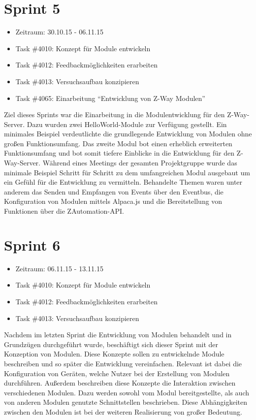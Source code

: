 \documentclass[12pt, oneside, smallheadings]{scrbook}
\begin{document}
\section{Sprint 5}
\begin{itemize}
	\item Zeitraum: 30.10.15 - 06.11.15
	\item Task \#4010: Konzept für Module entwickeln
	\item Task \#4012: Feedbackmöglichkeiten erarbeiten
	\item Task \#4013: Versuchsaufbau konzipieren
	\item Task \#4065: Einarbeitung "`Entwicklung von Z-Way Modulen"'
\end{itemize}
Ziel dieses Sprints war die Einarbeitung in die Modulentwicklung für den Z-Way-Server. Dazu wurden zwei HelloWorld-Module zur Verfügung gestellt. Ein minimales Beispiel verdeutlichte die grundlegende Entwicklung von Modulen ohne großen Funktionsumfang. Das zweite Modul bot einen erheblich erweiterten Funktionsumfang und bot somit tiefere Einblicke in die Entwicklung für den Z-Way-Server. Während eines Meetings der gesamten Projektgruppe wurde das minimale Beispiel Schritt für Schritt zu dem umfangreichen Modul ausgebaut um ein Gefühl für die Entwicklung zu vermitteln. Behandelte Themen waren unter anderem das Senden und Empfangen von Events über den Eventbus, die Konfiguration von Modulen mittels Alpaca.js und die Bereitstellung von Funktionen über die ZAutomation-API.

\section{Sprint 6}
\begin{itemize}
	\item Zeitraum: 06.11.15 - 13.11.15
	\item Task \#4010: Konzept für Module entwickeln	
	\item Task \#4012: Feedbackmöglichkeiten erarbeiten
	\item Task \#4013: Versuchsaufbau konzipieren
\end{itemize}
Nachdem im letzten Sprint die Entwicklung von Modulen behandelt und in Grundzügen durchgeführt wurde, beschäftigt sich dieser Sprint mit der Konzeption von Modulen. Diese Konzepte sollen zu entwickelnde Module beschreiben und so später die Entwicklung vereinfachen. Relevant ist dabei die Konfiguration von Geräten, welche  Nutzer bei der Erstellung von Modulen durchführen. Außerdem beschreiben diese Konzepte die Interaktion zwischen verschiedenen Modulen. Dazu werden sowohl vom Modul bereitgestellte, als auch von anderen Modulen genutzte Schnittstellen beschrieben. Diese Abhängigkeiten zwischen den Modulen ist bei der weiteren Realisierung von großer Bedeutung.
\end{document}
